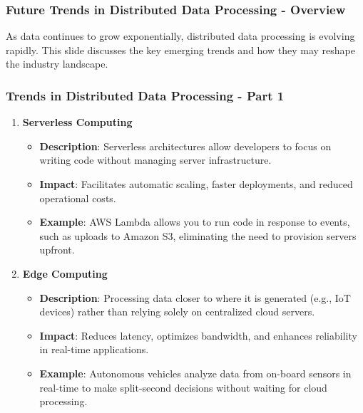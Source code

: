 \documentclass[aspectratio=169]{beamer}
\begin{document}
\begin{frame}[fragile]
  \frametitle{Future Trends in Distributed Data Processing - Overview}
  As data continues to grow exponentially, distributed data processing is evolving rapidly. This slide discusses the key emerging trends and how they may reshape the industry landscape.
\end{frame}

\begin{frame}[fragile]
  \frametitle{Trends in Distributed Data Processing - Part 1}
  \begin{enumerate}
    \item \textbf{Serverless Computing}
    \begin{itemize}
      \item \textbf{Description}: Serverless architectures allow developers to focus on writing code without managing server infrastructure.
      \item \textbf{Impact}: Facilitates automatic scaling, faster deployments, and reduced operational costs.
      \item \textbf{Example}: AWS Lambda allows you to run code in response to events, such as uploads to Amazon S3, eliminating the need to provision servers upfront.
    \end{itemize}

    \item \textbf{Edge Computing}
    \begin{itemize}
      \item \textbf{Description}: Processing data closer to where it is generated (e.g., IoT devices) rather than relying solely on centralized cloud servers.
      \item \textbf{Impact}: Reduces latency, optimizes bandwidth, and enhances reliability in real-time applications.
      \item \textbf{Example}: Autonomous vehicles analyze data from on-board sensors in real-time to make split-second decisions without waiting for cloud processing.
    \end{itemize}
  \end{enumerate}
\end{frame}
\end{document}
